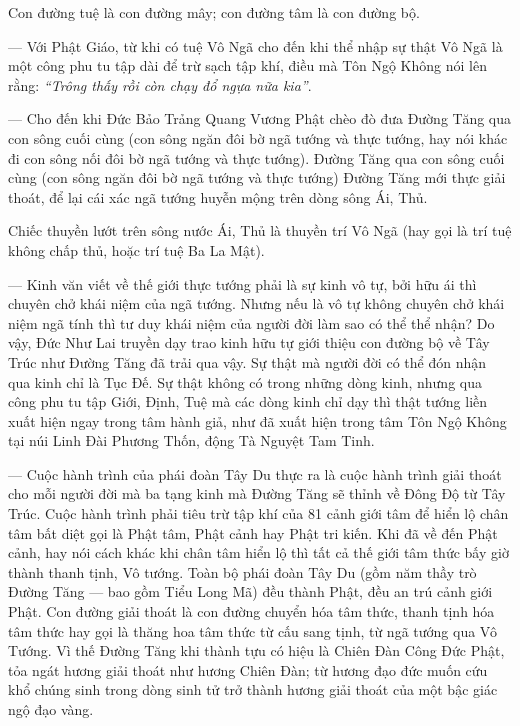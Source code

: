 Con đường tuệ là con đường mây; con đường tâm là con đường bộ.

— Với Phật Giáo, từ khi có tuệ Vô Ngã cho đến khi thể nhập sự thật Vô Ngã là một công phu tu tập dài để trừ sạch tập khí, điều mà Tôn Ngộ Không nói lên rằng: \emph{``Trông thấy rồi còn chạy đổ ngựa nữa kia''}.

— Cho đến khi Đức Bảo Trảng Quang Vương Phật chèo đò đưa Đường Tăng qua con sông cuối cùng (con sông ngăn đôi bờ ngã tướng và thực tướng, hay nói khác đi con sông nối đôi bờ ngã tướng và thực tướng). Đường Tăng qua con sông cuối cùng (con sông ngăn đôi bờ ngã tướng và thực tướng) Đường Tăng mới thực giải thoát, để lại cái xác ngã tướng huyễn mộng trên dòng sông Ái, Thủ.

Chiếc thuyền lướt trên sông nước Ái, Thủ là thuyền trí Vô Ngã (hay gọi là trí tuệ không chấp thủ, hoặc trí tuệ Ba La Mật).

— Kinh văn viết về thế giới thực tướng phải là sự kinh vô tự, bởi hữu ái thì chuyên chở khái niệm của ngã tướng. Nhưng nếu là vô tự không chuyên chở khái niệm ngã tính thì tư duy khái niệm của người đời làm sao có thể thể nhận? Do vậy, Đức Như Lai truyền dạy trao kinh hữu tự giới thiệu con đường bộ về Tây Trúc như Đường Tăng đã trải qua vậy. Sự thật mà người đời có thể đón nhận qua kinh chỉ là Tục Đế. Sự thật không có trong những dòng kinh, nhưng qua công phu tu tập Giới, Định, Tuệ mà các dòng kinh chỉ dạy thì thật tướng liền xuất hiện ngay trong tâm hành giả, như đã xuất hiện trong tâm Tôn Ngộ Không tại núi Linh Đài Phương Thốn, động Tà Nguyệt Tam Tinh.

— Cuộc hành trình của phái đoàn Tây Du thực ra là cuộc hành trình giải thoát cho mỗi người đời mà ba tạng kinh mà Đường Tăng sẽ thỉnh về Đông Độ từ Tây Trúc. Cuộc hành trình phải tiêu trừ tập khí của 81 cảnh giới tâm để hiển lộ chân tâm bất diệt gọi là Phật tâm, Phật cảnh hay Phật tri kiến. Khi đã về đến Phật cảnh, hay nói cách khác khi chân tâm hiển lộ thì tất cả thế giới tâm thức bấy giờ thành thanh tịnh, Vô tướng. Toàn bộ phái đoàn Tây Du (gồm năm thầy trò Đường Tăng — bao gồm Tiểu Long Mã) đều thành Phật, đều an trú cảnh giới Phật. Con đường giải thoát là con đường chuyển hóa tâm thức, thanh tịnh hóa tâm thức hay gọi là thăng hoa tâm thức từ cấu sang tịnh, từ ngã tướng qua Vô Tướng. Vì thế Đường Tăng khi thành tựu có hiệu là Chiên Đàn Công Đức Phật, tỏa ngát hương giải thoát như hương Chiên Đàn; từ hương đạo đức muốn cứu khổ chúng sinh trong dòng sinh tử trở thành hương giải thoát của một bậc giác ngộ đạo vàng.

